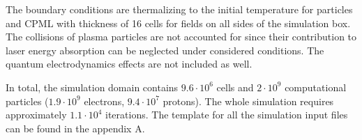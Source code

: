 The boundary conditions are thermalizing to the initial temperature for particles and CPML with thickness of 16 cells for fields on all sides of the simulation box. The collisions of plasma particles are not accounted for since their contribution to laser energy absorption can be neglected under considered conditions. The quantum electrodynamics effects are not included as well.

In total, the simulation domain contains $ 9.6 \cdot 10^{6} $ cells and $ 2 \cdot 10^{9} $ computational particles ($ 1.9 \cdot 10^{9} $ electrons, $ 9.4 \cdot 10^{7} $ protons). The whole simulation requires approximately $ 1.1 \cdot 10^{4} $ iterations. The template for all the simulation input files can be found in the appendix A.